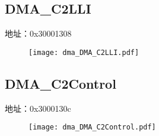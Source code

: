 \subsection{DMA\_C2LLI}
\label{dma-DMA-C2LLI}
地址：0x30001308
 \begin{figure}[H]
\texttt{[image: dma\_DMA\_C2LLI.pdf]}
\end{figure}

\subsection{DMA\_C2Control}
\label{dma-DMA-C2Control}
地址：0x3000130c
 \begin{figure}[H]
\texttt{[image: dma\_DMA\_C2Control.pdf]}
\end{figure}

